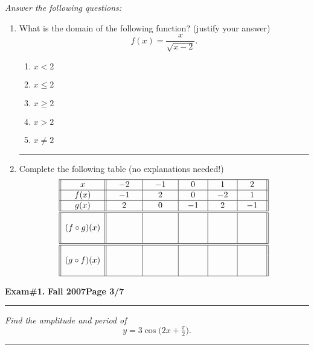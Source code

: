 \documentclass[12pt]{article}
\begin{document}
\bigskip
{\problem[20 pts] \em  Answer the following questions:}
\begin{enumerate} 
\item What is the domain of the following function? (justify your answer)
\begin{equation*}
f(x) = \frac{x}{\sqrt{x-2}}.
\end{equation*}
\begin{enumerate}
\item $x < 2$
\item $x \leq 2$
\item $x \geq 2$
\item $x > 2$
\item $x \neq 2$
\end{enumerate}
\vspace{4cm}
\hrule
\item Complete the following table (no explanations needed!)
\begin{equation*}
\begin{array}{||c||c|c|c|c|c||}
\hline x & \quad -2 \quad & \quad -1\quad & \quad 0\quad  & \quad 1\quad  & \quad 2\quad  \\
\hline f(x) & -1 & 2 & 0 & -2 & 1 \\
\hline g(x) & 2 & 0 & -1 & 2 & -1\\
\hline \hline & & & & & \\
 (f \circ g)(x) & & & & & \\ & & & & & \\
\hline \hline & & & & & \\
 (g \circ f)(x) & & & & & \\ & & & & & \\
\hline
\end{array}
\end{equation*}
\end{enumerate}
\newpage

\hfill{\large\bf Exam\#1.}\hfill{\large\bf
  Fall 2007}\hfill{\large\bf Page 3/7}\hrule

\bigskip
{\problem[10pts] \em Find the amplitude and period of}
\begin{equation*}
y = 3 \cos \big( 2x + \tfrac{\pi}{2} \big).
\end{equation*}
\vspace{6cm}
\begin{flushright}
\end{flushright}
\hrule
\end{document}
